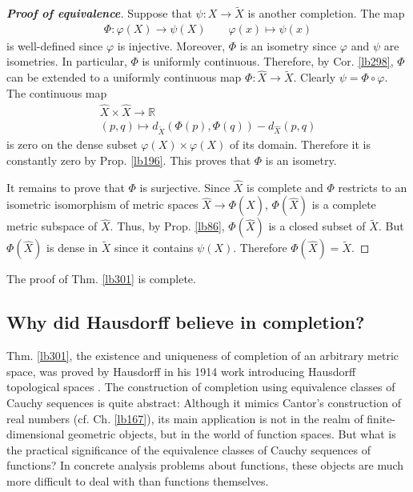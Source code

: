 \documentclass[12pt,b5paper,notitlepage]{article}
\theoremstyle{definition}
\theoremstyle{plain}
\newcommand{\wtd}{\widetilde}
\newcommand{\wht}{\widehat}
\newcommand{\Rbb}{\mathbb R}
\numberwithin{equation}{section}
\begin{document}
\begin{proof}[\textbf{Proof of equivalence}]
Suppose that $\psi:X\rightarrow\wtd X$ is another completion. The map
\begin{gather*}
\Phi:\varphi(X)\rightarrow \psi(X)\qquad \varphi(x)\mapsto\psi(x)
\end{gather*}
is well-defined since $\varphi$ is injective. Moreover, $\Phi$ is an isometry since $\varphi$ and $\psi$ are isometries. In particular, $\Phi$ is uniformly continuous. Therefore, by Cor. \ref{lb298}, $\Phi$ can be extended to a uniformly continuous map $\Phi:\wht X\rightarrow\wtd X$. Clearly $\psi=\Phi\circ\varphi$. The continuous map
\begin{gather*}
\wht X\times\wht X\rightarrow \Rbb\\
(p,q)\mapsto d_{\wtd X}(\Phi(p),\Phi(q))-d_{\wht X}(p,q)
\end{gather*}
is zero on the dense subset $\varphi(X)\times \varphi(X)$ of its domain. Therefore it is constantly zero by Prop. \ref{lb196}. This proves that $\Phi$ is an isometry.

It remains to prove that $\Phi$ is surjective. Since $\wht X$ is complete and $\Phi$ restricts to an isometric isomorphism of metric spaces $\wht X\rightarrow\Phi(\wht X)$, $\Phi(\wht X)$ is a complete metric subspace of $\wht X$. Thus, by Prop. \ref{lb86}, $\Phi(\wht X)$ is a closed subset of $\wtd X$. But $\Phi(\wht X)$ is dense in $\wtd X$ since it contains $\psi(X)$. Therefore $\Phi(\wht X)=\wtd X$.
\end{proof}

The proof of Thm. \ref{lb301} is complete.





\subsection{Why did Hausdorff believe in completion?}


Thm. \ref{lb301}, the existence and uniqueness of completion of an arbitrary metric space, was proved by Hausdorff in his 1914 work introducing Hausdorff topological spaces \cite[Sec. 8.8, p.315]{Hau14}. The construction of completion using equivalence classes of Cauchy sequences is quite abstract: Although it mimics  Cantor's construction of real numbers (cf. Ch. \ref{lb167}), its main application is not in the realm of finite-dimensional geometric objects, but in the world of function spaces. But what is the practical significance of the equivalence classes of Cauchy sequences of functions? In concrete analysis problems about functions, these objects are much more difficult to deal with than functions themselves.
\end{document}
